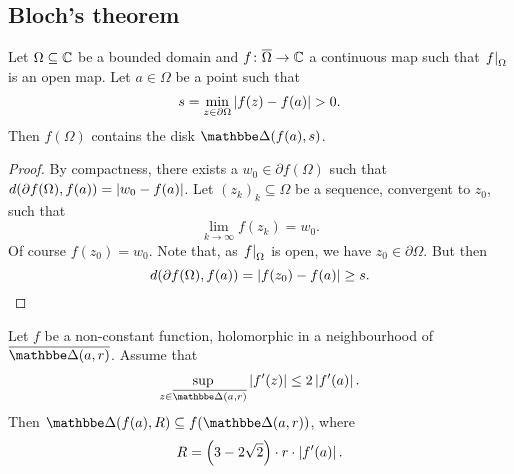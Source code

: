 \newpage

\subsection{Bloch's theorem}


\begin{lema}
Let $\Omega \subseteq \mathbb{C}$ be a bounded domain and
$f \colon \overline{\Omega} \to \mathbb{C}$ a continuous map such that
$\left. f\right|_{\Omega}^{}$ is an open map. Let $a \in \Omega$ be a point
such that
\[
s = \min_{z \in \partial \Omega} \left\lvert f(z) - f(a)\right\rvert > 0.
\]
Then $f(\Omega)$ contains the disk $\dsk(f(a), s)$.
\end{lema}

\begin{proof}
By compactness, there exists a $w_0 \in \partial f(\Omega)$ such
that $d(\partial f(\Omega), f(a)) = \left\lvert w_0 - f(a)\right\rvert$. Let
$(z_k)_k \subseteq \Omega$ be a sequence, convergent to $z_0$, such
that
\[
\lim_{k \to \infty} f(z_k) = w_0.
\]
Of course $f(z_0) = w_0$. Note that, as $\left. f\right|_{\Omega}^{}$ is
open, we have $z_0 \in \partial \Omega$. But then
\[
d(\partial f(\Omega), f(a)) = \left\lvert f(z_0) - f(a)\right\rvert \geq s. \qedhere
\]
\end{proof}

\begin{lema}
\label{thm_hol:lm:bloch}
Let $f$ be a non-constant function, holomorphic in a neighbourhood
of $\oline{\dsk(a, r)}$. Assume that
\[
\sup_{z \in \oline{\dsk(a,r)}} \abs{f'(z)} \leq 2 \abs{f'(a)}.
\]
Then $\dsk(f(a), R) \subseteq f(\dsk(a, r))$, where
\[
R = \left(3 - 2 \sqrt{2}\right) \cdot r \cdot \left\lvert f'(a)\right\rvert.
\]
\end{lema}

